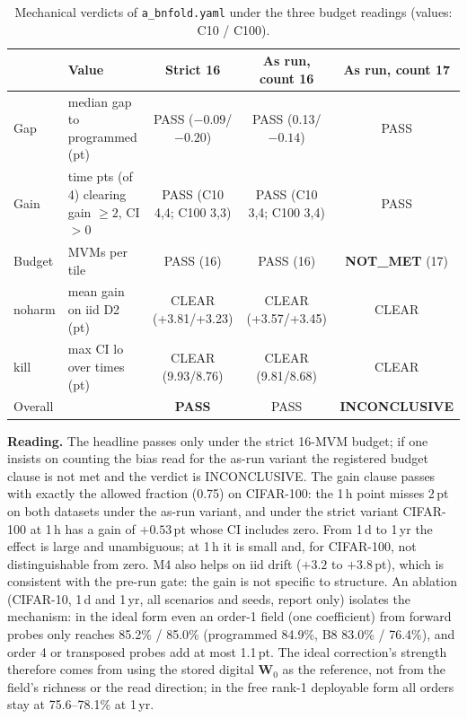 \documentclass[journal]{IEEEtran}
\newcommand{\mfour}{\textsc{M4}}
\newcommand{\bviii}{\textsc{B8}}
\newcommand{\pt}{\,pt}
\newcommand{\W}{\mathbf{W}}
\begin{document}
\begin{table}[t]
\caption{Mechanical verdicts of \texttt{a\_bnfold.yaml} under the three budget readings (values: C10 / C100).}
\label{tab:bfverdict}
\centering\footnotesize
\begin{tabular}{p{0.9cm}p{4.5cm}ccc}
\toprule
 & Value & Strict 16 & As run, count 16 & As run, count 17 \\
\midrule
Gap & median gap to programmed (pt) & PASS ($-0.09$/$-0.20$) & PASS (0.13/$-0.14$) & PASS \\
Gain & time pts (of 4) clearing gain $\ge2$, CI$>0$ & PASS (C10 4,4; C100 3,3) & PASS (C10 3,4; C100 3,4) & PASS \\
Budget & MVMs per tile & PASS (16) & PASS (16) & \textbf{NOT\_MET} (17) \\
noharm & mean gain on iid D2 (pt) & CLEAR (+3.81/+3.23) & CLEAR (+3.57/+3.45) & CLEAR \\
kill & max CI lo over times (pt) & CLEAR (9.93/8.76) & CLEAR (9.81/8.68) & CLEAR \\
\midrule
Overall & & \textbf{PASS} & PASS & \textbf{INCONCLUSIVE} \\
\bottomrule
\end{tabular}
\end{table}

\textbf{Reading.} The headline passes only under the strict 16-MVM budget; if one insists on counting the bias read for the as-run variant the registered budget clause is not met and the verdict is INCONCLUSIVE.
The gain clause passes with exactly the allowed fraction (0.75) on CIFAR-100: the 1\,h point misses 2\pt{} on both datasets under the as-run variant, and under the strict variant CIFAR-100 at 1\,h has a gain of $+0.53$\pt{} whose CI includes zero.
From 1\,d to 1\,yr the effect is large and unambiguous; at 1\,h it is small and, for CIFAR-100, not distinguishable from zero.
\mfour{} also helps on iid drift ($+3.2$ to $+3.8$\pt), which is consistent with the pre-run gate: the gain is not specific to structure. An ablation (CIFAR-10, 1\,d and 1\,yr, all scenarios and seeds, report only) isolates the mechanism: in the ideal form even an order-1 field (one coefficient) from forward probes only reaches 85.2\% / 85.0\% (programmed 84.9\%, \bviii{} 83.0\% / 76.4\%), and order 4 or transposed probes add at most 1.1\pt. The ideal correction's strength therefore comes from using the stored digital $\W_0$ as the reference, not from the field's richness or the read direction; in the free rank-1 deployable form all orders stay at 75.6--78.1\% at 1\,yr.
\end{document}
